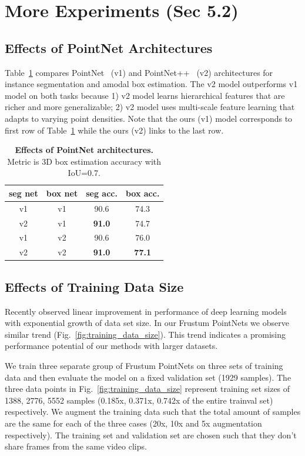\section{More Experiments (Sec 5.2)}
\label{sec:supp_more_exp}

\subsection{Effects of PointNet Architectures}
Table~\ref{tab:v1v2} compares PointNet~\cite{qi2017pointnet} (v1) and PointNet++~\cite{qi2017pointnetplusplus} (v2) architectures for instance segmentation and amodal box estimation. The v2 model outperforms v1 model on both tasks because 1) v2 model learns hierarchical features that are richer and more generalizable; 2) v2 model uses multi-scale feature learning that adapts to varying point densities. Note that the ours (v1) model corresponds to first row of Table~\ref{tab:v1v2} while the ours (v2) links to the last row.

\begin{table}[h!]
\centering
\begin{tabular}{cc|cc}
\hline
seg net & box net & seg acc. & box acc. \\ \hline
v1   & v1   & 90.6 & 74.3  \\
v2   & v1   & \textbf{91.0} & 74.7 \\
v1   & v2   & 90.6 & 76.0 \\
v2   & v2   & \textbf{91.0}  & \textbf{77.1} \\ \hline
\end{tabular}
\caption{\textbf{Effects of PointNet architectures.} Metric is 3D box estimation accuracy with IoU=0.7.}
\label{tab:v1v2}
\end{table}

\subsection{Effects of Training Data Size}

Recently \cite{sun2017revisiting} observed linear improvement in performance of deep learning models with exponential growth of data set size. In our Frustum PointNets we observe similar trend (Fig.~\ref{fig:training_data_size}). This trend indicates a promising performance potential of our methods with larger datasets.

We train three separate group of Frustum PointNets on three sets of training data and then evaluate the model on a fixed validation set (1929 samples). The three data points in Fig.~\ref{fig:training_data_size} represent training set sizes of 1388, 2776, 5552 samples (0.185x, 0.371x, 0.742x of the entire trainval set) respectively. We augment the training data such that the total amount of samples are the same for each of the three cases (20x, 10x and 5x augmentation respectively). The training set and validation set are chosen such that they don't share frames from the same video clips.

